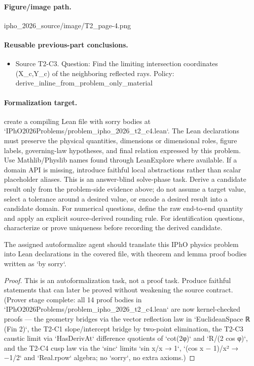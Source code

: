 \paragraph{Figure/image path.}
ipho\_2026\_source/image/T2\_page-4.png

\paragraph{Reusable previous-part conclusions.}
\begin{itemize}
\item Source T2-C3. Question: Find the limiting intersection coordinates (X\_c,Y\_c) of the neighboring reflected rays. Policy: derive\_inline\_from\_problem\_only\_material
\end{itemize}

\paragraph{Formalization target.}
create a compiling Lean file with sorry bodies at `IPhO2026Problems/problem\_ipho\_2026\_t2\_c4.lean`.
The Lean declarations must preserve the physical quantities, dimensions or dimensional roles, figure labels, governing-law hypotheses, and final relation expressed by this problem.
Use Mathlib/Physlib names found through LeanExplore where available. If a domain API is missing, introduce faithful local abstractions rather than scalar placeholder aliases.
This is an answer-blind solve-phase task. Derive a candidate result only from the problem-side evidence above; do not assume a target value, select a tolerance around a desired value, or encode a desired result into a candidate domain.
For numerical questions, define the raw end-to-end quantity and apply an explicit source-derived rounding rule. For identification questions, characterize or prove uniqueness before recording the derived candidate.

\begin{theorem}
\label{thm:physics:ipho_2026_t2_c4:target}
\leanok
The assigned autoformalize agent should translate this IPhO physics problem into Lean declarations in the covered file, with theorem and lemma proof bodies written as `by sorry`.
\end{theorem}
\begin{proof}
\leanok
This is an autoformalization task, not a proof task. Produce faithful statements that can later be proved without weakening the source contract. (Prover stage complete: all 14 proof bodies in `IPhO2026Problems/problem_ipho_2026_t2_c4.lean` are now kernel-checked proofs — the geometry bridges via the vector reflection law in `EuclideanSpace ℝ (Fin 2)`, the T2-C1 slope/intercept bridge by two-point elimination, the T2-C3 caustic limit via `HasDerivAt` difference quotients of `cot(2φ)` and `R/(2 cos φ)`, and the T2-C4 cusp law via the `sinc` limits `sin x/x → 1`, `(cos x − 1)/x² → −1/2` and `Real.rpow` algebra; no `sorry`, no extra axioms.)
\end{proof}
